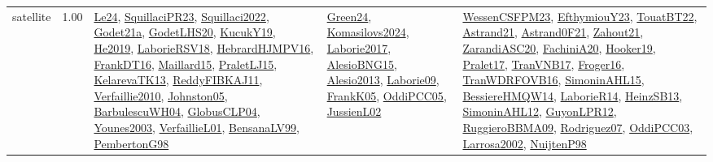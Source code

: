{\begin{longtable}{p{3cm}r>{\raggedright\arraybackslash}p{6cm}>{\raggedright\arraybackslash}p{6cm}>{\raggedright\arraybackslash}p{8cm}}
\index{satellite}\index{ApplicationAreas!satellite}satellite &  1.00 & \hyperref[detail:Le24]{Le24}, \hyperref[detail:SquillaciPR23]{SquillaciPR23}, \hyperref[detail:Squillaci2022]{Squillaci2022}, \hyperref[detail:Godet21a]{Godet21a}, \hyperref[detail:GodetLHS20]{GodetLHS20}, \hyperref[detail:KucukY19]{KucukY19}, \hyperref[detail:He2019]{He2019}, \hyperref[detail:LaborieRSV18]{LaborieRSV18}, \hyperref[detail:HebrardHJMPV16]{HebrardHJMPV16}, \hyperref[detail:FrankDT16]{FrankDT16}, \hyperref[detail:Maillard15]{Maillard15}, \hyperref[detail:PraletLJ15]{PraletLJ15}, \hyperref[detail:KelarevaTK13]{KelarevaTK13}, \hyperref[detail:ReddyFIBKAJ11]{ReddyFIBKAJ11}, \hyperref[detail:Verfaillie2010]{Verfaillie2010}, \hyperref[detail:Johnston05]{Johnston05}, \hyperref[detail:BarbulescuWH04]{BarbulescuWH04}, \hyperref[detail:GlobusCLP04]{GlobusCLP04}, \hyperref[detail:Younes2003]{Younes2003}, \hyperref[detail:VerfaillieL01]{VerfaillieL01}, \hyperref[detail:BensanaLV99]{BensanaLV99}, \hyperref[detail:PembertonG98]{PembertonG98} & \hyperref[detail:Green24]{Green24}, \hyperref[detail:Komasilovs2024]{Komasilovs2024}, \hyperref[detail:Laborie2017]{Laborie2017}, \hyperref[detail:AlesioBNG15]{AlesioBNG15}, \hyperref[detail:Alesio2013]{Alesio2013}, \hyperref[detail:Laborie09]{Laborie09}, \hyperref[detail:FrankK05]{FrankK05}, \hyperref[detail:OddiPCC05]{OddiPCC05}, \hyperref[detail:JussienL02]{JussienL02} & \hyperref[detail:WessenCSFPM23]{WessenCSFPM23}, \hyperref[detail:EfthymiouY23]{EfthymiouY23}, \hyperref[detail:TouatBT22]{TouatBT22}, \hyperref[detail:Astrand21]{Astrand21}, \hyperref[detail:Astrand0F21]{Astrand0F21}, \hyperref[detail:Zahout21]{Zahout21}, \hyperref[detail:ZarandiASC20]{ZarandiASC20}, \hyperref[detail:FachiniA20]{FachiniA20}, \hyperref[detail:Hooker19]{Hooker19}, \hyperref[detail:Pralet17]{Pralet17}, \hyperref[detail:TranVNB17]{TranVNB17}, \hyperref[detail:Froger16]{Froger16}, \hyperref[detail:TranWDRFOVB16]{TranWDRFOVB16}, \hyperref[detail:SimoninAHL15]{SimoninAHL15}, \hyperref[detail:BessiereHMQW14]{BessiereHMQW14}, \hyperref[detail:LaborieR14]{LaborieR14}, \hyperref[detail:HeinzSB13]{HeinzSB13}, \hyperref[detail:SimoninAHL12]{SimoninAHL12}, \hyperref[detail:GuyonLPR12]{GuyonLPR12}, \hyperref[detail:RuggieroBBMA09]{RuggieroBBMA09}, \hyperref[detail:Rodriguez07]{Rodriguez07}, \hyperref[detail:OddiPCC03]{OddiPCC03}, \hyperref[detail:Larrosa2002]{Larrosa2002}, \hyperref[detail:NuijtenP98]{NuijtenP98}\\

\end{longtable}}
